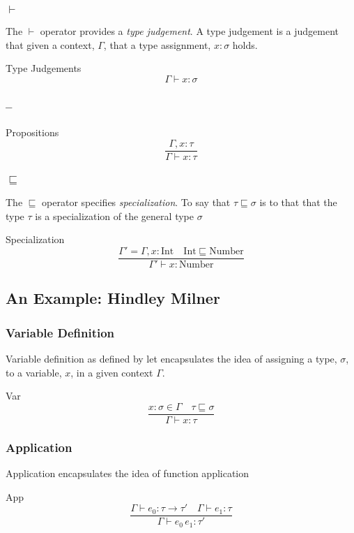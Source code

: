 \documentclass{beamer}
\begin{document}
\begin{frame}
  \frametitle{$\vdash$}
  The $\vdash$ operator provides a \emph{type judgement}.  A type
  judgement is a judgement that given a context, $\Gamma$, that a type
  assignment, $x : \sigma$ holds.
  \begin{exampleblock}{Type Judgements}
    \[
      \Gamma \vdash x : \sigma
    \]
  \end{exampleblock}
\end{frame}

\begin{frame}
  \frametitle{\---}
  \begin{exampleblock}{Propositions}
    \[
      \frac{\Gamma, x : \tau}{\Gamma \vdash x : \tau}
    \]
  \end{exampleblock}
\end{frame}

\begin{frame}
  \frametitle{$\sqsubseteq$}
  The $\sqsubseteq$ operator specifies \emph{specialization}.  To say
  that $\tau \sqsubseteq \sigma$ is to that that the type $\tau$ is a
  specialization of the general type $\sigma$
  \begin{exampleblock}{Specialization}
    \[
      \frac{\Gamma' = \Gamma, x : \text{Int} \quad \text{Int} \sqsubseteq \text{Number}}
      {\Gamma' \vdash x : \text{Number} }
    \]
  \end{exampleblock}
\end{frame}

\subsection{An Example: Hindley Milner}

\begin{frame}
  \frametitle{Variable Definition}
  Variable definition as defined by let encapsulates the idea of
  assigning a type, $\sigma$, to a variable, $x$, in a given context
  $\Gamma$.

  \begin{exampleblock}{Var}
    \[
      \frac{x:\sigma \in \Gamma \quad \tau \sqsubseteq \sigma}{\Gamma \vdash x : \tau}
    \]
  \end{exampleblock}
\end{frame}

\begin{frame}
  \frametitle{Application}
  Application encapsulates the idea of function application

  \begin{exampleblock}{App}
    \[
      \frac{\Gamma \vdash e_0 : \tau \rightarrow \tau' \quad \Gamma \vdash e_1 : \tau}
      {\Gamma \vdash e_0\, e_1 : \tau'}
    \]
  \end{exampleblock}
\end{frame}
\end{document}
